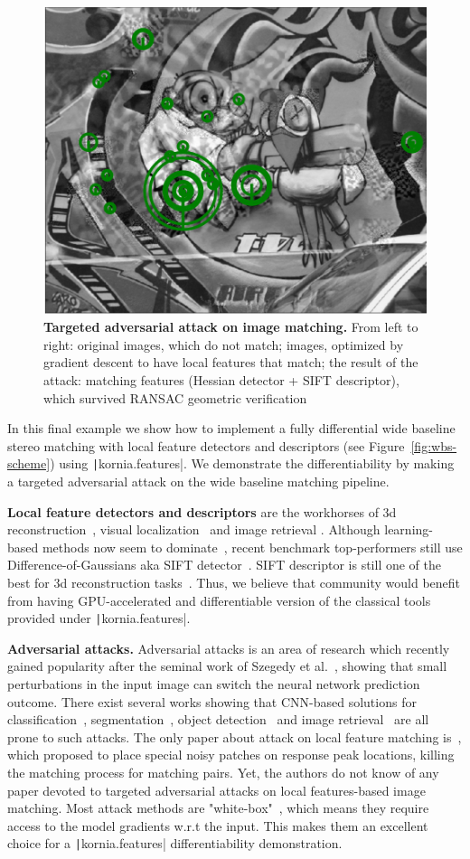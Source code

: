 \begin{figure}[tb]
\begin{center}
        \includegraphics[width=0.32\linewidth]{main/chapter03/data/wbs/0_inl.jpg} 
    \end{center}
    \caption[Targeted adversarial attack on image matching]{{\bf Targeted adversarial attack on image matching.} From left to right: original images, which do not match; images, optimized by gradient descent to have local features that match; the result of the attack: matching features (Hessian detector + SIFT descriptor), which survived RANSAC geometric verification}
    \label{fig:wbs}
\end{figure}
In this final  example we show how to implement a  fully differential wide baseline stereo matching with local feature detectors and descriptors (see Figure~\ref{fig:wbs-scheme}) using \texttt|kornia.features|. We demonstrate the differentiability by making a targeted adversarial attack on the wide baseline matching pipeline.

\textbf{Local feature detectors and descriptors} are the workhorses of 3d reconstruction~\citep{schonberger2016structure, torii2018structure}, visual localization~\citep{sarlin2019coarse} and image retrieval \citep{shen2018matchable}. Although learning-based methods now seem to dominate~\citep{LocaFeaturesReview2018}, recent benchmark top-performers still use Difference-of-Gaussians aka SIFT detector~\citep{CVPRW2019}. SIFT descriptor is still one of the best for 3d reconstruction tasks~\citep{ColmapBenchmark2017}. Thus, we believe that community would benefit from having GPU-accelerated and differentiable version of the classical tools provided under \texttt|kornia.features|.

\textbf{Adversarial attacks.}
Adversarial attacks is an area of research which recently gained popularity after the seminal work of Szegedy et al.~\citep{AdvAttack2014}, showing that small perturbations in the input image can switch the neural network prediction outcome. There exist several  works showing that CNN-based solutions for classification~\citep{NIPS2018Adv}, segmentation~\citep{arnab_cvpr_2018}, object detection~\citep{ObjDetAdv2018} and image retrieval~\citep{AdvRetrieval2019}   are all prone to such attacks. 
The only paper about attack on local feature matching is~\citep{adversarial_attack_local_features2019l}, which proposed to place special noisy patches on response peak locations, killing the matching process for matching pairs. Yet, the authors do not know of any paper devoted to targeted adversarial attacks on local features-based image matching. 
Most attack methods are "white-box"~\citep{NIPS2018Adv}, which means they require access to the model gradients w.r.t the input. This makes them an excellent choice for a \texttt|kornia.features| differentiability demonstration.

